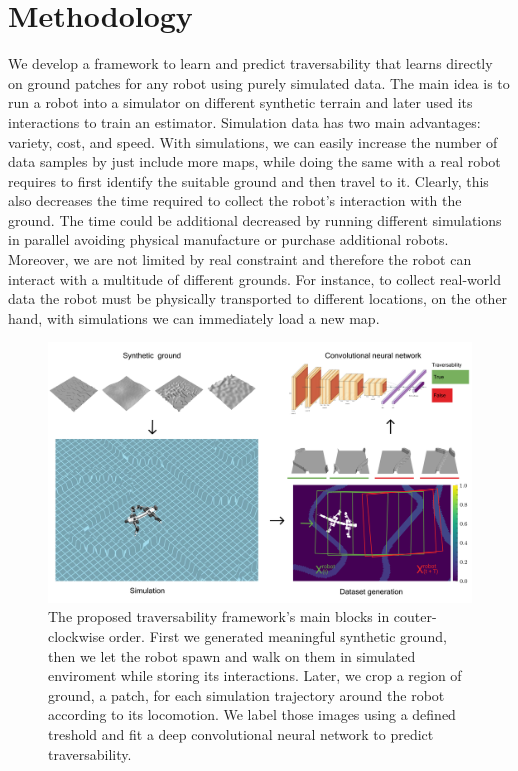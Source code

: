 \documentclass[../document.tex]{subfiles}
\begin{document}
\chapter{Methodology}
We develop a framework to learn and predict traversability that learns directly on ground patches for any robot using purely simulated data. The main idea is to run a robot into a simulator on different synthetic terrain and later used its interactions to train an estimator. Simulation data has two main advantages: variety, cost, and speed. With simulations, we can easily increase the number of data samples by just include more maps, while doing the same with a real robot requires to first identify the suitable ground and then travel to it. Clearly, this also decreases the time required to collect the robot's interaction with the ground. The time could be additional decreased by running different simulations in parallel avoiding physical manufacture or purchase additional robots. 
Moreover, we are not limited by real constraint and therefore the robot can interact with a multitude of different grounds. For instance, to collect real-world data the robot must be physically transported to different locations, on the other hand, with simulations we can immediately load a new map.
\begin{figure}[H]
    \centering
        \includegraphics[width=\textwidth]{../img/method.png}
    \caption{The proposed traversability framework's main blocks in couter-clockwise order. First we generated meaningful synthetic ground, then we let the robot spawn and walk on them in simulated enviroment while storing its interactions. Later, we crop a region of ground, a patch, for each simulation trajectory around the robot according to its locomotion. We label those images using a defined treshold and fit a deep convolutional neural network to predict traversability. }
    \end{figure}
\end{document}
